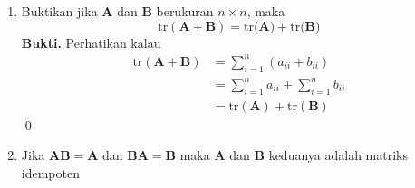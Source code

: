 \documentclass[a4paper, 12pt]{article}
\begin{document}
\begin{enumerate}
    \textbf{Bukti.} Kita bisa tuliskan entri suatu matriks $\mathbf{I_n}$ sebagai berikut
    \[\mathbf{(I)_{ij}} = \begin{cases}
        1, i = j\\ 0, i \neq j
    \end{cases}\]
    Tinjau kalau
    \begin{align*}
        \mathbf{(AI)}_{ij} &= \sum_{k = 1}^n (\mathbf{A})_{ik}(\mathbf{I})_{kj}
    \end{align*}
    Perhatikan untuk $k\neq j $, kita punya $\mathbf{I}_{kj} = 0$ dan untuk $k= j$, kita punya   $\mathbf{I}_{kj} = 1$. Sehingga kita  peroleh
      \begin{align*}
        \mathbf{(AI)}_{ij} &= \sum_{k = 1}^n (\mathbf{A})_{ik}(\mathbf{I})_{kj}
        \\
        & = (\mathbf{A})_{ij}\times 1
        \\
        &= \mathbf{A}_{ij} \tag{1}
    \end{align*}
    Dengan langkah serupa, 
    \begin{align*}
        \mathbf{(IA)}_{ij} &= \sum_{k = 1}^n (\mathbf{I})_{ik}(\mathbf{A})_{kj}
        \\
        & =1\times  (\mathbf{A})_{ij}
        \\
        &= \mathbf{A}_{ij} \tag{2}
    \end{align*}
    Akibatnya $\mathbf{AI} = \mathbf{IA} = \mathbf{A}$\qed
    \item Buktikan jika $\mathbf{A}$ dan $\mathbf{B}$ berukuran $n\times n$, maka
    \[\text{tr}(\mathbf{A}+\mathbf{B})  = \text{tr($\mathbf{A})$}+\text{tr($\mathbf{B}$)}\]
     \textbf{Bukti.} Perhatikan kalau
    \begin{align*}
        \text{tr}(\mathbf{A}+\mathbf{B}) &= \sum_{i= 1}^n (a_{ii}+b_{ii})\\
        & = \sum_{i = 1}^n a_{ii} +\sum_{i = 1}^nb_{ii} 
        \\
        & = \text{tr}(\mathbf{A}) + \text{tr}(\mathbf B)
    \end{align*} \qed

    \item Jika $\mathbf{AB} = \mathbf{A}$ dan $\mathbf{BA} = \mathbf{B} $ maka $\mathbf{A}$ dan $\mathbf{B}$ keduanya adalah matriks idempoten



\end{enumerate}
\end{document}

